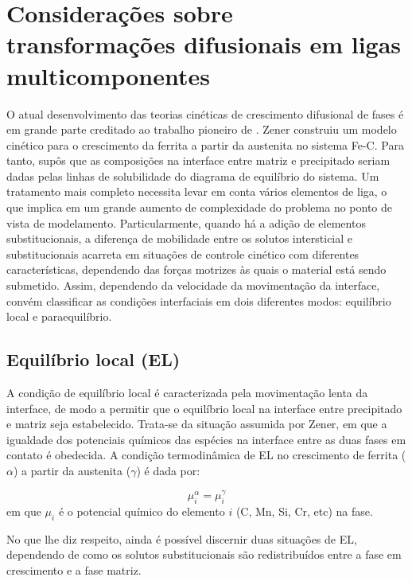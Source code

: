 \section{Considerações sobre transformações difusionais em ligas multicomponentes}

\label{sec:consTransf}

O atual desenvolvimento das teorias cinéticas de crescimento difusional de fases é em grande parte creditado ao trabalho pioneiro de . Zener construiu um modelo cinético para o crescimento da ferrita a partir da austenita no sistema Fe-C. Para tanto, supôs que as composições na interface entre matriz e precipitado seriam dadas pelas linhas de solubilidade do diagrama de equilíbrio do sistema. Um tratamento mais completo necessita levar em conta vários elementos de liga, o que implica em um grande aumento de complexidade do problema no ponto de vista de modelamento. Particularmente, quando há a adição de elementos substitucionais, a diferença de mobilidade entre os solutos intersticial e substitucionais acarreta em situações de controle cinético com diferentes características, dependendo das forças motrizes às quais o material está sendo submetido. Assim, dependendo da velocidade da movimentação da interface, convém classificar as condições interfaciais em dois diferentes modos: equilíbrio local e paraequilíbrio.

\subsection{Equilíbrio local (EL)}
  

A condição de equilíbrio local é caracterizada pela movimentação lenta da interface, de modo a permitir que o equilíbrio local na interface entre precipitado e matriz seja estabelecido. Trata-se da situação assumida por Zener, em que a igualdade dos potenciais químicos das espécies na interface entre as duas fases em contato é obedecida. A condição termodinâmica de EL no crescimento de ferrita ($\alpha$) a partir da austenita ($\gamma$) é dada por:

\begin{equation}
  \mu_i^\alpha = \mu_i^\gamma
\end{equation}
%
em que $\mu_i$ é o potencial químico do elemento $i$ (C, Mn, Si, Cr, etc) na fase.

No que lhe diz respeito, ainda é possível discernir duas situações de EL, dependendo de como os solutos substitucionais são redistribuídos entre a fase em crescimento e a fase matriz.

